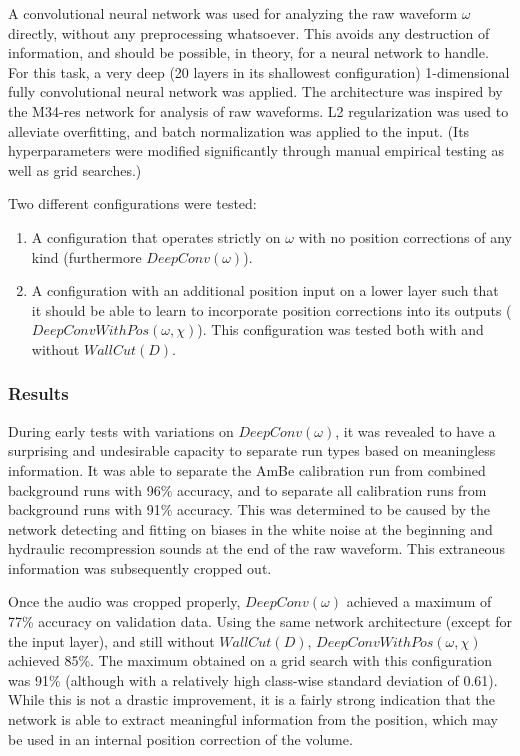 \documentclass[10pt]{article}
\begin{document}
A convolutional neural network was used for analyzing the raw waveform $\omega$ directly, without any preprocessing whatsoever. This avoids any destruction of information, and should be possible, in theory, for a neural network to handle. For this task, a very deep (20 layers in its shallowest configuration) 1-dimensional fully convolutional neural network was applied. The architecture was inspired by the M34-res network \cite{verydeepconvnets} for analysis of raw waveforms. L2 regularization was used to alleviate overfitting, and batch normalization was applied to the input. (Its hyperparameters were modified significantly through manual empirical testing as well as grid searches.)

Two different configurations were tested:
\begin{enumerate}
    \item A configuration that operates strictly on $\omega$ with no position corrections of any kind (furthermore $DeepConv(\omega)$).
    \item A configuration with an additional position input on a lower layer such that it should be able to learn to incorporate position corrections into its outputs ($DeepConvWithPos(\omega, \chi)$). This configuration was tested both with and without $WallCut(D)$.
\end{enumerate}

\subsubsection{Results}

During early tests with variations on $DeepConv(\omega)$, it was revealed to have a surprising and undesirable capacity to separate run types based on meaningless information. It was able to separate the AmBe calibration run from combined background runs with 96\% accuracy, and to separate all calibration runs from background runs with 91\% accuracy. This was determined to be caused by the network detecting and fitting on biases in the white noise at the beginning and hydraulic recompression sounds at the end of the raw waveform. This extraneous information was subsequently cropped out.

Once the audio was cropped properly, $DeepConv(\omega)$ achieved a maximum of 77\% accuracy on validation data. Using the same network architecture (except for the input layer), and still without $WallCut(D)$, $DeepConvWithPos(\omega, \chi)$ achieved 85\%. The maximum obtained on a grid search with this configuration was 91\% (although with a relatively high class-wise standard deviation of 0.61). While this is not a drastic improvement, it is a fairly strong indication that the network is able to extract meaningful information from the position, which may be used in an internal position correction of the volume.
\end{document}
